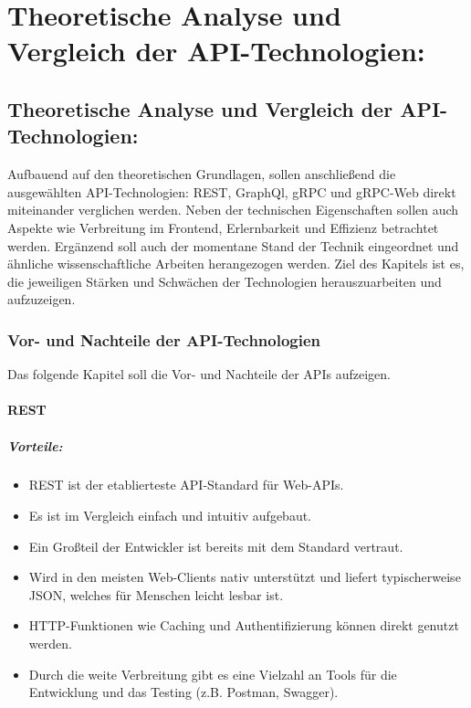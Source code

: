 \chapter{Theoretische Analyse und Vergleich der API-Technologien:}
\label{chap:intro}
\chapterstart

\section{Theoretische Analyse und Vergleich der API-Technologien:}

Aufbauend auf den theoretischen Grundlagen, sollen anschließend die ausgewählten API-Technologien: REST, GraphQl, gRPC und gRPC-Web direkt miteinander verglichen werden. Neben der technischen Eigenschaften sollen auch Aspekte wie Verbreitung im Frontend, Erlernbarkeit und Effizienz betrachtet werden. Ergänzend soll auch der momentane Stand der Technik eingeordnet und ähnliche wissenschaftliche Arbeiten herangezogen werden.
Ziel des Kapitels ist es, die jeweiligen Stärken und Schwächen der Technologien herauszuarbeiten und aufzuzeigen.

\subsection{Vor- und Nachteile der API-Technologien}

Das folgende Kapitel soll die Vor- und Nachteile der APIs aufzeigen.

\subsubsection{REST}

\paragraph{Vorteile:}
\begin{itemize}
	\item REST ist der etablierteste API-Standard für Web-APIs.
	\item Es ist im Vergleich einfach und intuitiv aufgebaut.
	\item Ein Großteil der Entwickler ist bereits mit dem Standard vertraut.
	\item Wird in den meisten Web-Clients nativ unterstützt und liefert typischerweise JSON, welches für Menschen leicht lesbar ist.
	\item HTTP-Funktionen wie Caching und Authentifizierung können direkt genutzt werden.
	\item Durch die weite Verbreitung gibt es eine Vielzahl an Tools für die Entwicklung und das Testing (z.B. Postman, Swagger).
\end{itemize}

